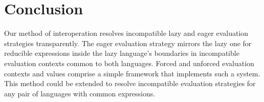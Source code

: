 \chapter{Conclusion}

Our method of interoperation resolves incompatible lazy and eager evaluation strategies transparently. The eager evaluation strategy mirrors the lazy one for reducible expressions inside the lazy language's boundaries in incompatible evaluation contexts common to both languages. Forced and unforced evaluation contexts and values comprise a simple framework that implements such a system. This method could be extended to resolve incompatible evaluation strategies for any pair of languages with common expressions.